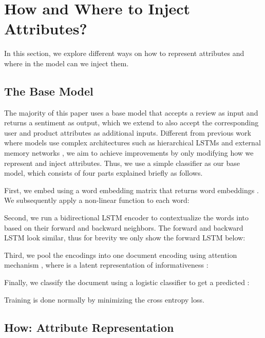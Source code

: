 \documentclass[11pt,a4paper]{article}
\begin{document}
\section{How and Where to Inject Attributes?}
\label{sec:models}

In this section, we explore different ways on how to represent attributes and where in the model can we inject them.

\subsection{The Base Model}

The majority of this paper uses a base model that accepts a review  as input and returns a sentiment  as output, which we extend to also accept the corresponding user  and product  attributes as additional inputs.
Different from previous work where models use complex architectures such as hierarchical LSTMs \cite{chen2016neural,zhu2017parallel} and external memory networks \cite{dou2017capturing,long2018dual}, we aim to achieve improvements by only modifying how we represent and inject attributes. Thus, we use a simple classifier as our base model, which consists of four parts explained briefly as follows.

First, we embed  using a word embedding matrix that returns word embeddings . We subsequently apply a non-linear function to each word:

Second, we run a bidirectional LSTM \cite{hochreiter1997long} encoder to contextualize the words into  based on their forward and backward neighbors. The forward and backward LSTM look similar, thus for brevity we only show the forward LSTM below:

Third, we pool the encodings  into one document encoding  using attention mechanism \cite{bahdanau2015neural}, where  is a latent representation of informativeness \cite{yang2016hierarchical}:

Finally, we classify the document using a logistic classifier to get a predicted :

Training is done normally by minimizing the cross entropy loss.

\subsection{How: Attribute Representation}
\end{document}
